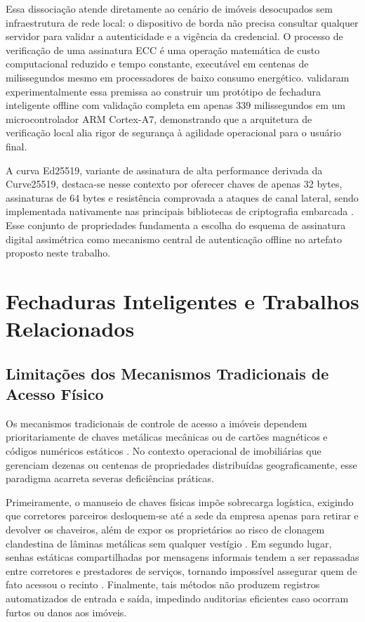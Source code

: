 Essa dissociação atende diretamente ao cenário de imóveis desocupados sem infraestrutura de rede local: o dispositivo de borda não precisa consultar qualquer servidor para validar a autenticidade e a vigência da credencial. O processo de verificação de uma assinatura ECC é uma operação matemática de custo computacional reduzido e tempo constante, executável em centenas de milissegundos mesmo em processadores de baixo consumo energético.  validaram experimentalmente essa premissa ao construir um protótipo de fechadura inteligente offline com validação completa em apenas 339 milissegundos em um microcontrolador ARM Cortex-A7, demonstrando que a arquitetura de verificação local alia rigor de segurança à agilidade operacional para o usuário final.

A curva Ed25519, variante de assinatura de alta performance derivada da Curve25519, destaca-se nesse contexto por oferecer chaves de apenas 32 bytes, assinaturas de 64 bytes e resistência comprovada a ataques de canal lateral, sendo implementada nativamente nas principais bibliotecas de criptografia embarcada \cite{hanblockchainoffline2018}. Esse conjunto de propriedades fundamenta a escolha do esquema de assinatura digital assimétrica como mecanismo central de autenticação offline no artefato proposto neste trabalho.

\section{Fechaduras Inteligentes e Trabalhos Relacionados}
\label{sec:fechaduras}

\subsection{Limitações dos Mecanismos Tradicionais de Acesso Físico}
\label{subsec:limitacoes-tradicionais}

Os mecanismos tradicionais de controle de acesso a imóveis dependem prioritariamente de chaves metálicas mecânicas ou de cartões magnéticos e códigos numéricos estáticos \cite{satanasaowapak2021, camargosilvablockchain2023}. No contexto operacional de imobiliárias que gerenciam dezenas ou centenas de propriedades distribuídas geograficamente, esse paradigma acarreta severas deficiências práticas.

Primeiramente, o manuseio de chaves físicas impõe sobrecarga logística, exigindo que corretores parceiros desloquem-se até a sede da empresa apenas para retirar e devolver os chaveiros, além de expor os proprietários ao risco de clonagem clandestina de lâminas metálicas sem qualquer vestígio \cite{satanasaowapak2021}. Em segundo lugar, senhas estáticas compartilhadas por mensagens informais tendem a ser repassadas entre corretores e prestadores de serviços, tornando impossível assegurar quem de fato acessou o recinto \cite{camargosilvablockchain2023}. Finalmente, tais métodos não produzem registros automatizados de entrada e saída, impedindo auditorias eficientes caso ocorram furtos ou danos aos imóveis.

